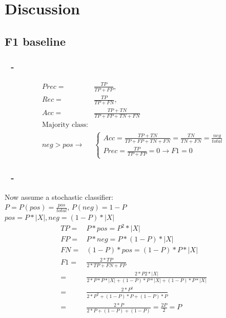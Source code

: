 \documentclass{beamer}
\newenvironment{dia}
{
\begin{frame}[fragile, environment=dia]
\frametitle{\insertsection
\ifx\insertsubsection\empty\else
      \,~-~\insertsubsection             %
   \fi}
}
{
\end{frame}
}
\begin{document}
\section{Discussion}
\subsection*{F1 baseline}

\begin{dia}
\begin{align*}
Prec=&\frac{TP}{TP+FP}, \\
Rec=&\frac{TP}{TP+FN}, \\
Acc=&\frac{TP+TN}{TP+FP+TN+FN}\\
\text{Majority class:}\\
 neg>pos\rightarrow& \begin{cases}Acc=\frac{TP+TN}{TP+FP+TN+FN}=\frac{TN}{TN+FN}=\frac{neg}{total}\\Prec=\frac{TP}{TP+FP}=0\rightarrow F1=0\end{cases}
\end{align*}
\end{dia}
\begin{dia}
Now assume a stochastic classifier: \\
$P=P(pos)=\frac{pos}{total}$, $P(neg)=1-P$\\

$pos=P*|X|, neg=(1-P)*|X|$
\begin{align*}
TP=&P*pos=P^2*|X|\\
FP=&P*neg=P*(1-P)*|X|\\
FN=&(1-P)*pos=(1-P)*P*|X|\\
F1=&\frac{2*TP}{2*TP+FN+FP}\\
=&\frac{2*P2*|X|}{2*P*P*|X|+(1-P)*P*|X|+(1-P)*P*|X|}\\
=&\frac{2*P^2}{2*P^2+(1-P)*P+(1-P)*P}\\
=&\frac{2*P}{2*P+(1-P)+(1-P)}=\frac{2P}{2}=P\\
\end{align*}
\end{dia}
\end{document}
